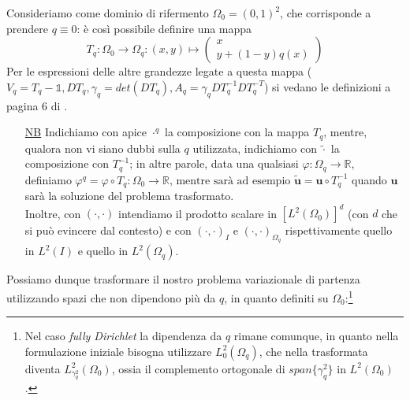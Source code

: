 \documentclass[a4paper,11pt,twoside]{article}
\renewcommand{\u}{\mathbf{u}}
\newcommand{\Oq}{{\Omega_q}}
\theoremstyle{plain}
\theoremstyle{definition}
\theoremstyle{remark}
\begin{document}
Consideriamo come dominio di rifermento $\Omega_0=(0,1)^2$, che corrisponde a prendere $q\equiv 0$: \`e cos\`i possibile definire una mappa
$$T_q :\Omega_0\rightarrow\Omega_q:(x,y)\mapsto \begin{pmatrix}x\\y+(1-y)q(x)\end{pmatrix}$$
Per le espressioni delle altre grandezze legate a questa mappa ($V_q=T_q-\mathds{1},DT_q,\gamma_q=det(DT_q),A_q=\gamma_qDT_q^{-1}DT_q^{-T}$) si vedano le definizioni a pagina 6 di \cite{Kinigera}.\\
\begin{itemize}
\item[\underline{NB}]%
Indichiamo con apice $\cdot^q$ la composizione con la mappa $T_q$, mentre, qualora non vi siano dubbi sulla $q$ utilizzata, indichiamo con $\widetilde{\cdot}$ la composizione con $T_q^{-1}$; in altre parole, data una qualsiasi $\varphi:\Omega_q\rightarrow\mathds{R}$, definiamo $\varphi^q=\varphi \circ T_q:\Omega_0\to\mathds{R}\text{, mentre sarà ad esempio }\widetilde{\u}=\u\circ T_q^{-1}$ quando $\u$ sarà la soluzione del problema trasformato.\\
Inoltre, con $(\cdot,\cdot)$ intendiamo il prodotto scalare in $[L^2(\Omega_0)]^d$ (con $d$ che si pu\`o evincere dal contesto) e con $(\cdot,\cdot)_I$ e $(\cdot,\cdot)_\Oq$ rispettivamente quello in $L^2(I)$ e quello in $L^2(\Oq)$.
\end{itemize}
Possiamo dunque trasformare il nostro problema variazionale di partenza utilizzando spazi che non dipendono pi\`u da $q$, in quanto definiti su $\Omega_0$:\footnote{Nel caso \emph{fully Dirichlet} la dipendenza da $q$ rimane comunque, in quanto nella formulazione iniziale bisogna utilizzare $L^2_0(\Omega_q)$, che nella trasformata diventa $L^2_{\gamma_q^2}(\Omega_0)$, ossia il complemento ortogonale di $span\{\gamma_q^2\}$ in $L^2(\Omega_0)$.}\\
\end{document}
